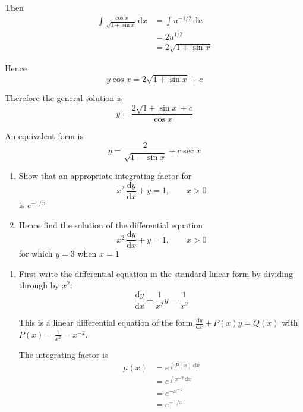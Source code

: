 \documentclass[leqno]{article}
\begin{document}
\begin{enumerate}[
  label=\textbf{\arabic*.},
  leftmargin=*,
  topsep=0pt,
  partopsep=0pt,
  parsep=0pt
]
\begin{djsSolution}
Then
\begin{align*}
\int \frac{\cos x}{\sqrt{1+\sin x}}\,\mathrm{d}x
&= \int u^{-1/2}\,\mathrm{d}u \\
&= 2u^{1/2} \\
&= 2\sqrt{1+\sin x}
\end{align*}

Hence
\[
y\cos x=2\sqrt{1+\sin x}+c
\]

Therefore the general solution is
\[
y=\frac{2\sqrt{1+\sin x}+c}{\cos x}
\]

An equivalent form is
\[
y=\frac{2}{\sqrt{1-\sin x}}+c\sec x
\]
\end{djsSolution}


\newpage

\questionitem

\begin{enumerate}[label=\textbf{(\alph*)}]
  \item Show that an appropriate integrating factor for
  \[
  x^2\,\frac{\mathrm{d}y}{\mathrm{d}x}+y=1,\qquad x>0
  \]
  is $e^{-1/x}$  \\
  \item Hence find the solution of the differential equation
  \[
  x^2\,\frac{\mathrm{d}y}{\mathrm{d}x}+y=1,\qquad x>0
  \]
  for which $y=3$ when $x=1$  \\
\end{enumerate}

\vspace*{10pt}

\begin{djsSolution}
\begin{enumerate}[label=\textbf{(\alph*)}]
  \item First write the differential equation in the standard linear form by dividing through by $x^2$:
\[
\frac{\mathrm{d}y}{\mathrm{d}x}+\frac{1}{x^2}y=\frac{1}{x^2}
\]

This is a linear differential equation of the form \(\frac{\mathrm{d}y}{\mathrm{d}x}+P(x)y=Q(x)\) with \(P(x)=\frac{1}{x^2}=x^{-2}\).

The integrating factor is
\begin{align*}
\mu(x)&=e^{\int P(x)\,\mathrm{d}x} \\
&=e^{\int x^{-2}\,\mathrm{d}x} \\
&=e^{-x^{-1}} \\
&=e^{-1/x}
\end{align*}


\end{enumerate}
\end{djsSolution}
\end{enumerate}
\end{document}
